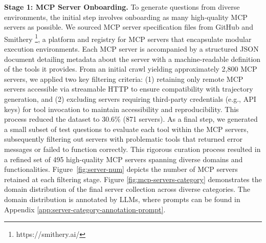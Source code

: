 \textbf{\textcolor{orange!90!black}{Stage 1: MCP Server Onboarding.}}
To generate questions from diverse environments, the initial step involves onboarding as many high-quality MCP servers as possible. We sourced MCP server specification files from GitHub and Smithery \footnote{https://smithery.ai/}, a platform and registry for MCP servers that encapsulate modular execution environments. Each MCP server is accompanied by a structured JSON document detailing metadata about the server with a machine-readable definition of the tools it provides. From an initial crawl yielding approximately 2,800 MCP servers, we applied two key filtering criteria: (1) retaining only remote MCP servers accessible via streamable HTTP to ensure compatibility with trajectory generation, and (2) excluding servers requiring third-party credentials (e.g., API keys) for tool invocation to maintain accessibility and reproducibility. This process reduced the dataset to 30.6\% (871 servers). As a final step, we generated a small subset of test questions to evaluate each tool within the MCP servers, subsequently filtering out servers with problematic tools that returned error messages or failed to function correctly. This rigorous curation process resulted in a refined set of 495 high-quality MCP servers spanning diverse domains and functionalities.
Figure~\ref{fig:server-num} depicts the number of MCP servers retained at each filtering stage. Figure \ref{fig:mcp-servers-category} demonstrates the domain distribution of the final server collection across diverse categories. The domain distribution is annotated by LLMs, where prompts can be found in Appendix \ref{app:server-category-annotation-prompt}.


